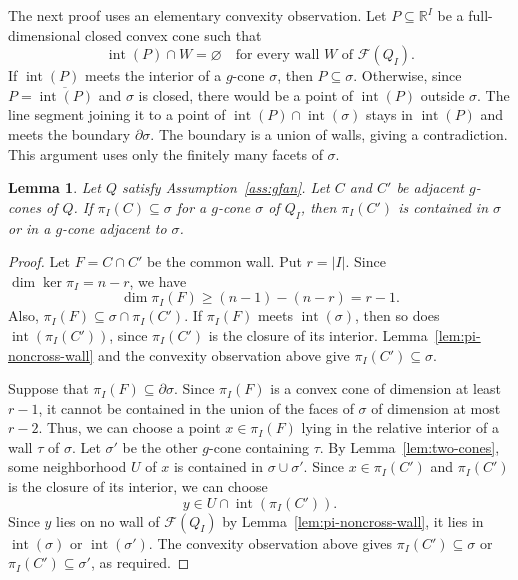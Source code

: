 \documentclass[11pt,reqno]{amsart}
\numberwithin{equation}{section}
\theoremstyle{definition}
\theoremstyle{plain}
\newtheorem{lemma}[example]{Lemma}
\renewcommand{\int}{\operatorname{int}}
\begin{document}
	The next proof uses an elementary convexity observation. Let $P\subseteq\mathbb R^I$ be a full-dimensional closed convex cone such that
	\[
	\int(P)\cap W=\varnothing
	\quad\text{for every wall }W\text{ of }\mathcal F(Q_I).
	\]
	If $\int(P)$ meets the interior of a $g$-cone $\sigma$, then $P\subseteq\sigma$. Otherwise, since $P=\overline{\int(P)}$ and $\sigma$ is closed, there would be a point of $\int(P)$ outside $\sigma$. The line segment joining it to a point of $\int(P)\cap\int(\sigma)$ stays in $\int(P)$ and meets the boundary $\partial\sigma$. The boundary is a union of walls, giving a contradiction. This argument uses only the finitely many facets of $\sigma$.
	
	\begin{lemma}\label{lem:pi-adjacent-cones}
		Let $Q$ satisfy Assumption~\ref{ass:gfan}. Let $C$ and $C'$ be adjacent $g$-cones of $Q$. If $\pi_I(C)\subseteq\sigma$ for a $g$-cone $\sigma$ of $Q_I$, then $\pi_I(C')$ is contained in $\sigma$ or in a $g$-cone adjacent to $\sigma$.
	\end{lemma}
	
	\begin{proof}
		Let $F=C\cap C'$ be the common wall. Put $r = |I|$. Since $\dim\ker\pi_I=n-r$, we have
		\[
		\dim\pi_I(F)\ge (n-1)-(n-r)=r-1.
		\]
		Also, $\pi_I(F)\subseteq \sigma\cap\pi_I(C')$. If $\pi_I(F)$ meets $\operatorname{int}(\sigma)$, then so does $\operatorname{int}(\pi_I(C'))$, since $\pi_I(C')$ is the closure of its interior. Lemma~\ref{lem:pi-noncross-wall} and the convexity observation above give $\pi_I(C')\subseteq\sigma$.
		
		Suppose that $\pi_I(F)\subseteq\partial\sigma$. Since $\pi_I(F)$ is a convex cone of dimension at least $r-1$, it cannot be contained in the union of the faces of $\sigma$ of dimension at most $r-2$. Thus, we can choose a point $x\in\pi_I(F)$ lying in the relative interior of a wall $\tau$ of $\sigma$. Let $\sigma'$ be the other $g$-cone containing $\tau$. By Lemma~\ref{lem:two-cones}, some neighborhood $U$ of $x$ is contained in $\sigma\cup\sigma'$. Since $x\in\pi_I(C')$ and $\pi_I(C')$ is the closure of its interior, we can choose
		\[
		y\in U\cap\operatorname{int}(\pi_I(C')).
		\]
		Since $y$ lies on no wall of $\mathcal F(Q_I)$ by Lemma~\ref{lem:pi-noncross-wall}, it lies in $\operatorname{int}(\sigma)$ or $\operatorname{int}(\sigma')$. The convexity observation above gives $\pi_I(C')\subseteq\sigma$ or $\pi_I(C')\subseteq\sigma'$, as required.
	\end{proof}
	
\end{document}
